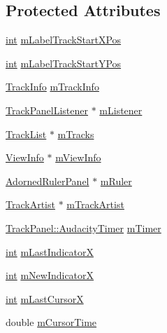 \subsection*{Protected Attributes}
\begin{DoxyCompactItemize}
\item 
\hyperlink{xmltok_8h_a5a0d4a5641ce434f1d23533f2b2e6653}{int} \hyperlink{class_track_panel_a42584f68b419de73ce42c7b15d7a4828}{m\+Label\+Track\+Start\+X\+Pos}
\item 
\hyperlink{xmltok_8h_a5a0d4a5641ce434f1d23533f2b2e6653}{int} \hyperlink{class_track_panel_a43f6840103e4cd755efd0f46edd0eb2e}{m\+Label\+Track\+Start\+Y\+Pos}
\item 
\hyperlink{class_track_info}{Track\+Info} \hyperlink{class_track_panel_a076667fd6be500cff9d6d972afded5e8}{m\+Track\+Info}
\item 
\hyperlink{class_track_panel_listener}{Track\+Panel\+Listener} $\ast$ \hyperlink{class_track_panel_a0f11708f158f21a3600c407b483aa0d5}{m\+Listener}
\item 
\hyperlink{class_track_list}{Track\+List} $\ast$ \hyperlink{class_track_panel_aea9b67c765754459a262d976a2b5e45e}{m\+Tracks}
\item 
\hyperlink{class_view_info}{View\+Info} $\ast$ \hyperlink{class_track_panel_afc74f9edb01b0f01155406e69902dcad}{m\+View\+Info}
\item 
\hyperlink{class_adorned_ruler_panel}{Adorned\+Ruler\+Panel} $\ast$ \hyperlink{class_track_panel_a0c030045e204ac35bb3066a260831ce3}{m\+Ruler}
\item 
\hyperlink{class_track_artist}{Track\+Artist} $\ast$ \hyperlink{class_track_panel_a5b09b33be61ef200636b5513b45d2285}{m\+Track\+Artist}
\item 
\hyperlink{class_track_panel_1_1_audacity_timer}{Track\+Panel\+::\+Audacity\+Timer} \hyperlink{class_track_panel_ab8dd1b9f070a6331441767ae27564ad5}{m\+Timer}
\item 
\hyperlink{xmltok_8h_a5a0d4a5641ce434f1d23533f2b2e6653}{int} \hyperlink{class_track_panel_a30d53afc3d2f99fbd024056c50e292bc}{m\+Last\+IndicatorX}
\item 
\hyperlink{xmltok_8h_a5a0d4a5641ce434f1d23533f2b2e6653}{int} \hyperlink{class_track_panel_a3c48a491488b35dd70426d11b264955e}{m\+New\+IndicatorX}
\item 
\hyperlink{xmltok_8h_a5a0d4a5641ce434f1d23533f2b2e6653}{int} \hyperlink{class_track_panel_a8230d698d20caedc299b1dc46b76a009}{m\+Last\+CursorX}
\item 
double \hyperlink{class_track_panel_ae4269832b66adecb9fb64fbf9263d170}{m\+Cursor\+Time}

\end{DoxyCompactItemize}
